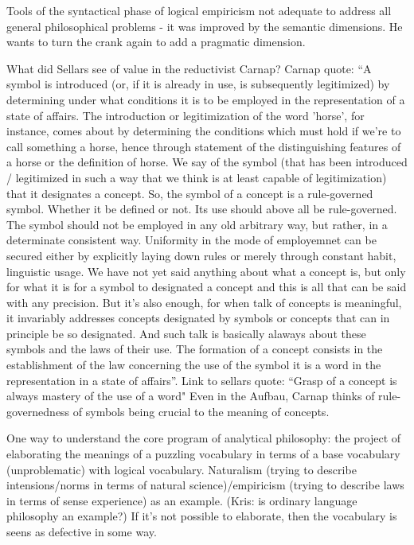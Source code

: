 \documentclass[12pt,a4paper]{report}
\begin{document}
Tools of the syntactical phase of logical empiricism not adequate to address all general philosophical problems - it was improved by the semantic dimensions. He wants to turn the crank again to add a pragmatic dimension.

What did Sellars see of value in the reductivist Carnap? Carnap quote: ``A symbol is introduced (or, if it is already in use, is subsequently legitimized) by determining under what conditions it is to be employed in the representation of a state of affairs. The introduction or legitimization of the word 'horse', for instance, comes about by determining the conditions which must hold if we're to call something a horse, hence through statement of the distinguishing features of a horse or the definition of horse. We say of the symbol (that has been introduced / legitimized in such a way that we think is at least capable of legitimization) that it designates a concept. So, the symbol of a concept is a rule-governed symbol. Whether it be defined or not. Its use should above all be rule-governed. The symbol should not be employed in any old arbitrary way, but rather, in a determinate consistent way. Uniformity in the mode of employemnet can be secured either by explicitly laying down rules or merely through constant habit, linguistic usage. We have not yet said anything about what a concept is, but only for what it is for a symbol to designated a concept and this is all that can be said with any precision. But it's also enough, for when talk of concepts is meaningful, it invariably addresses concepts designated by symbols or concepts that can in principle be so designated. And such talk is basically alaways about these symbols and the laws of their use. The formation of a concept consists in the establishment of the law concerning the use of the symbol it is a word in the representation in a state of affairs''. Link to sellars quote: ``Grasp of a concept is always mastery of the use of a word" Even in the Aufbau, Carnap thinks of rule-governedness of symbols being crucial to the meaning of concepts.

One way to understand the core program of analytical philosophy: the project of elaborating the meanings of a puzzling vocabulary in terms of a base vocabulary (unproblematic) with logical vocabulary. Naturalism (trying to describe intensions/norms in terms of natural science)/empiricism (trying to describe laws in terms of sense experience) as an example. (Kris: is ordinary language philosophy an example?) If it's not possible to elaborate, then the vocabulary is seens as defective in some way.
\end{document}
